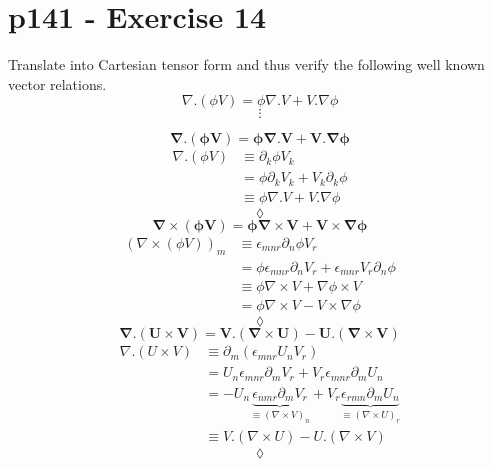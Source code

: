\section{p141 - Exercise 14}
\begin{tcolorbox}
Translate into Cartesian tensor form and thus verify the following well known vector relations.
$$ \nabla .  \left( \phi V \right) = \phi  \nabla . V + V .\nabla \phi $$
$$ \vdots$$
\end{tcolorbox}
$$ \mathbf{\nabla .  \left( \phi V \right) = \phi  \nabla .V + V .\nabla \phi }$$
\begin{align*}
\nabla .  \left( \phi V \right) &\equiv \partial_k \phi V_k\\
&= \phi\partial_k V_k+V_k\partial_k\phi\\
&\equiv \phi\nabla.V+V.\nabla\phi
\end{align*}
$$\lozenge$$
$$ \mathbf{\nabla \times  \left( \phi V \right) = \phi  \nabla \times V + V \times \nabla \phi }$$
\begin{align*}
\left( \nabla \times  \left( \phi V \right)\right)_m &\equiv \epsilon_{mnr}\partial_n \phi V_r\\
&= \phi\epsilon_{mnr}\partial_n V_r+\epsilon_{mnr}V_r\partial_n\phi\\
&\equiv \phi\nabla\times V+\nabla\phi \times V\\
&= \phi\nabla\times V-  V\times\nabla\phi
\end{align*}
$$\lozenge$$
$$ \mathbf{\nabla . \left( U\times V \right) = V .\left( \nabla \times U\right) -  U .\left( \nabla \times V\right)}$$
\begin{align*}
\nabla . \left( U\times V \right) &\equiv \partial_m \left(\epsilon_{mnr}U_n V_r\right)\\
&=  U_n\epsilon_{mnr} \partial_m  V_r+ V_r\epsilon_{mnr} \partial_mU_n\\
&=  -U_n\underbrace{\epsilon_{nmr} \partial_m  V_r}_{\equiv \left(\nabla \times V\right)_n}+ V_r\underbrace{\epsilon_{rmn} \partial_m U_n}_{\equiv \left(\nabla \times U\right)_r}\\
&\equiv V .\left( \nabla \times U\right) -  U .\left( \nabla \times V\right)
\end{align*}
$$\lozenge$$

